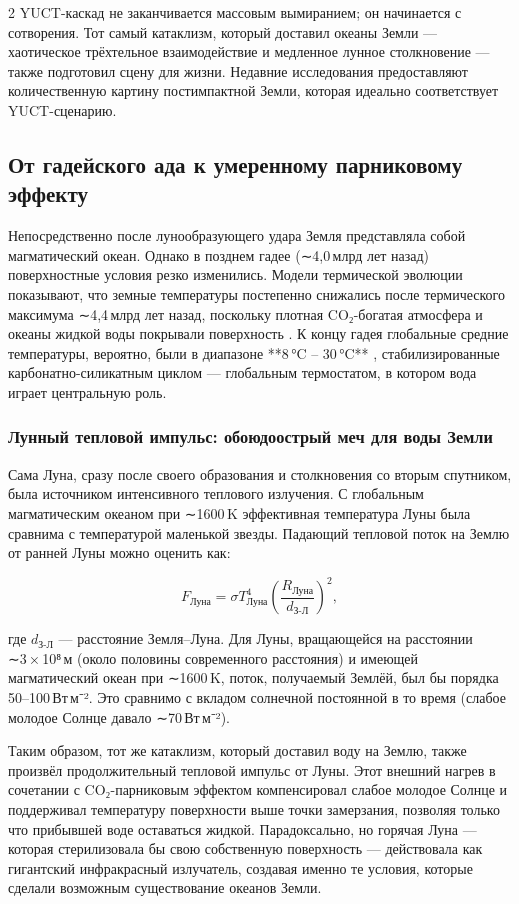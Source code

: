 \documentclass[11pt,a4paper]{article}
\begin{document}
\begin{multicols}{2}
		YUCT-каскад не заканчивается массовым вымиранием; он начинается с сотворения.
		Тот самый катаклизм, который доставил океаны Земли — хаотическое трёхтельное взаимодействие и медленное лунное столкновение — также подготовил сцену для жизни.
		Недавние исследования предоставляют количественную картину постимпактной Земли, которая идеально соответствует YUCT-сценарию.
		
		\subsection{От гадейского ада к умеренному парниковому эффекту}
		
		Непосредственно после лунообразующего удара Земля представляла собой магматический океан. Однако
		в позднем гадее (∼4,0 млрд лет назад) поверхностные условия резко изменились.
		Модели термической эволюции показывают, что земные температуры постепенно снижались после термического максимума ∼4,4 млрд лет назад, поскольку плотная CO₂-богатая атмосфера и океаны жидкой воды покрывали поверхность \cite{Korenaga2017}. К концу гадея глобальные средние температуры, вероятно, были в диапазоне **8 °C – 30 °C** \cite{Charnay2017}, стабилизированные карбонатно-силикатным циклом — глобальным термостатом, в котором вода играет центральную роль.
		
		\subsubsection{Лунный тепловой импульс: обоюдоострый меч для воды Земли}
		
		Сама Луна, сразу после своего образования и столкновения со вторым спутником, была источником интенсивного теплового излучения. С глобальным магматическим океаном при ∼1600 K эффективная температура Луны была сравнима с температурой маленькой звезды. Падающий тепловой поток на Землю от ранней Луны можно оценить как:
		
		\[
		F_{\text{Луна}} = \sigma T_{\text{Луна}}^{4} \left( \frac{R_{\text{Луна}}}{d_{\text{З-Л}}} \right)^{2},
		\]
		
		где \(d_{\text{З-Л}}\) — расстояние Земля–Луна. Для Луны, вращающейся на расстоянии ∼3 × 10⁸ м (около половины современного расстояния) и имеющей магматический океан при ∼1600 K, поток, получаемый Землёй, был бы порядка 50–100 Вт м⁻². Это сравнимо с вкладом солнечной постоянной в то время (слабое молодое Солнце давало ∼70 Вт м⁻²).
		
		Таким образом, тот же катаклизм, который доставил воду на Землю, также произвёл продолжительный тепловой импульс от Луны. Этот внешний нагрев в сочетании с CO₂-парниковым эффектом компенсировал слабое молодое Солнце и поддерживал температуру поверхности выше точки замерзания, позволяя только что прибывшей воде оставаться жидкой. Парадоксально, но горячая Луна — которая стерилизовала бы свою собственную поверхность — действовала как гигантский инфракрасный излучатель, создавая именно те условия, которые сделали возможным существование океанов Земли.
		

\end{multicols}
\end{document}
